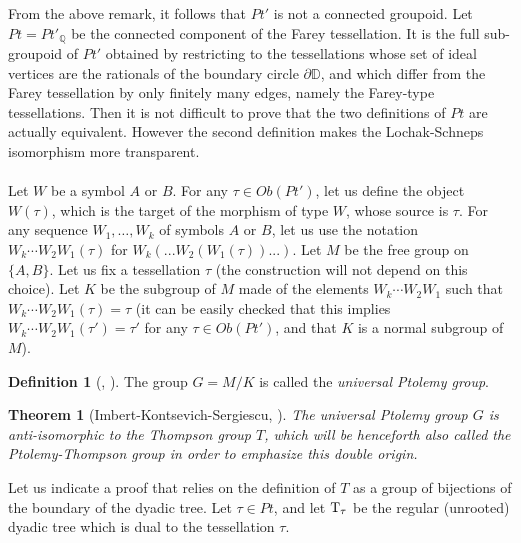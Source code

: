 \documentclass[twoside]{irmaems}
\theoremstyle{plain}
\newtheorem{theorem}{Theorem}[section]
\theoremstyle{definition}
\newtheorem{definition}{Definition}[section]
\theoremstyle{remark}
\newcommand{\Q}{{\mathbb{Q}}}
\begin{document}
\noindent 
From the above remark, it follows that $Pt'$ is not a connected groupoid. 
Let $Pt=Pt'_{\Q}$ be the connected component of the Farey tessellation. 
It is the full sub-groupoid of $Pt'$ obtained by restricting to 
the tessellations whose set of 
ideal vertices are the rationals of the boundary circle $\partial \mathbb D$, 
and which differ from the Farey tessellation 
by only finitely many edges, namely 
the Farey-type tessellations. 
Then it is not difficult to prove that the two definitions of $Pt$ are actually equivalent. However the second definition makes the Lochak-Schneps isomorphism 
more transparent. \\
    
\\
    
\noindent    
Let $W$ be a symbol  $A$ or $B$. For any $\tau\in Ob(Pt')$, let us define the object $W(\tau)$, which is the target 
of the morphism of type $W$, whose source is $\tau$. For any sequence
 $W_1,\ldots, W_k$ of symbols $A$ or $B$, let us use the notation  $W_k\cdots W_2W_1 (\tau)$ for
  $W_k(...W_2( W_1(\tau))...)$.    
Let  $M$ be the free group on  $\{A,B\}$. Let us fix a tessellation  $\tau$ (the construction will not depend on this choice). Let $K$ be the subgroup of $M$ 
made of the elements $W_k\cdots W_2 W_1$ such that $W_k\cdots W_2 W_1(\tau)=\tau$ 
(it can be easily checked that this implies $W_k\cdots W_2 W_1(\tau')=\tau'$ for any $\tau\in Ob(Pt')$, and that $K$ is a normal subgroup of $M$).


\begin{definition}[\cite{pe0}, \cite{pe}] 
The group  $G= M/K$ is called the {\em universal Ptolemy group}. 
\end{definition} 


\begin{theorem}[Imbert-Kontsevich-Sergiescu, \cite{im}]
The universal Ptolemy group  $G$ is anti-isomorphic to the  
Thompson group  $T$, 
which will be henceforth also called the Ptolemy-Thompson group in order 
to emphasize this double origin.  
\end{theorem}


\noindent 
Let us indicate a proof that relies on the definition of $T$ 
as a group of bijections of the boundary of the dyadic tree.  
Let  $\tau\in Pt$, and let  ${\rm T}_{\tau}$ be the regular 
(unrooted) dyadic tree which is dual to the tessellation $\tau$. 
\end{document}

